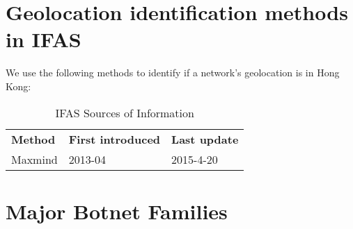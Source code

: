 \FloatBarrier

\section{Geolocation identification methods in IFAS}
We use the following methods to identify if a network's geolocation is in Hong Kong:
\begin{table}[!htbp]
\centering
\caption{IFAS Sources of Information}
\begin{tabular}{lll}
\hline
{\bf Method} & {\bf First introduced} & \bf Last update                                                                         \\\hhline{===}

Maxmind & 2013-04 & 2015-4-20
\\\hline
\end{tabular}
\end{table}
\newpage


\section{Major Botnet Families}

